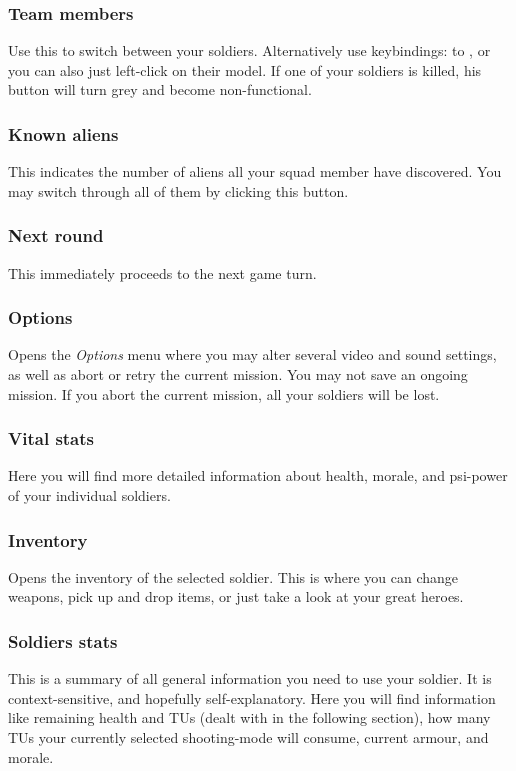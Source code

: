 \subsubsection{Team members}
Use this to switch between your soldiers. Alternatively use keybindings:  to , or you can also just left-click on their model. If one of your soldiers is killed, his button will turn grey and become non-functional.

\subsubsection{Known aliens}
This indicates the number of aliens all your squad member have discovered. You may switch through all of them by clicking this button.

\subsubsection{Next round}
This immediately proceeds to the next game turn.

\subsubsection{Options}
Opens the \emph{Options} menu where you may alter several video and sound settings, as well as abort or retry the current mission. You may not save an ongoing mission. If you abort the current mission, all your soldiers will be lost.

\subsubsection{Vital stats}
Here you will find more detailed information about health, morale, and psi-power of your individual soldiers.

\subsubsection{Inventory}
Opens the inventory of the selected soldier. This is where you can change weapons, pick up and drop items, or just take a look at your great heroes.

\subsubsection{Soldiers stats}
This is a summary of all general information you need to use your soldier. It is context-sensitive, and hopefully self-explanatory.  Here you will find information like remaining health and TUs (dealt with in the following section), how many TUs your currently selected shooting-mode will consume, current armour, and morale.


